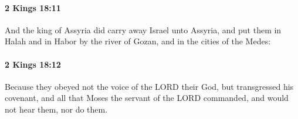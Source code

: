 		\paragraph{2 Kings 18:11} %
			\label{2KINGS-18-11}

			And the king of Assyria did carry away Israel unto Assyria, and put them in Halah and in Habor by the river of Gozan, and in the cities of the Medes:


		\paragraph{2 Kings 18:12} %
			\label{2KINGS-18-12}

			Because they obeyed not the voice of the LORD their God, but transgressed his covenant, and all that Moses the servant of the LORD commanded, and would not hear them, nor do them.


